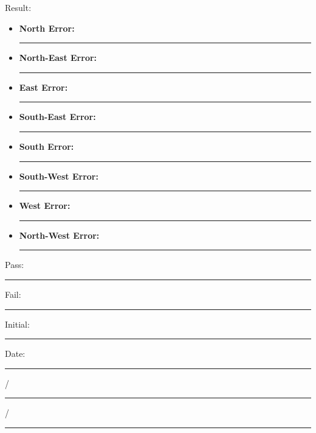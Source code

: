 {\Large Result:}\\
\begin{itemize}
\item \textbf{North Error:} \rule{2cm}{0.15mm} \textdegree
\item \textbf{North-East Error:} \rule{2cm}{0.15mm} \textdegree
\item \textbf{East Error:} \rule{2cm}{0.15mm} \textdegree
\item \textbf{South-East Error:} \rule{2cm}{0.15mm} \textdegree
\item \textbf{South Error:} \rule{2cm}{0.15mm} \textdegree
\item \textbf{South-West Error:} \rule{2cm}{0.15mm} \textdegree
\item \textbf{West Error:} \rule{2cm}{0.15mm} \textdegree
\item \textbf{North-West Error:} \rule{2cm}{0.15mm} \textdegree
\end{itemize}
\vfill
{\large Pass: \rule{1cm}{0.15mm} \hspace{1cm} Fail: \rule{1cm}{0.15mm}} \hfill Initial: \rule{2cm}{0.15mm} \hspace{1cm} Date: \rule{0.5cm}{0.15mm}/\rule{0.5cm}{0.15mm}/\rule{1cm}{0.15mm}\\[5pt]


